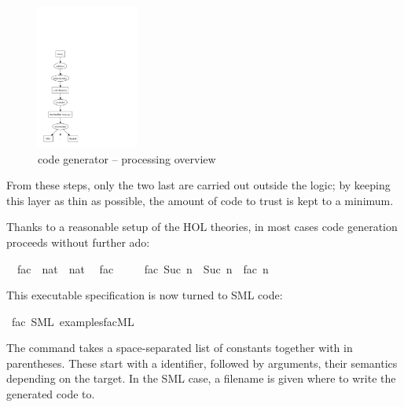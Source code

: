 \begin{isabellebody}
\begin{isamarkuptext}
\begin{itemize}
  \end{itemize}

  \begin{figure}[h]
  \centering
  \includegraphics[width=0.3\textwidth]{codegen_process}
  \caption{code generator -- processing overview}
  \label{fig:process}
  \end{figure}

  From these steps, only the two last are carried out
  outside the logic; by keeping this layer as
  thin as possible, the amount of code to trust is
  kept to a minimum.%
\end{isamarkuptext}%
\isamarkuptrue%
%
\isamarkuptrue%
%
\isamarkuptrue%
%
\begin{isamarkuptext}%
Thanks to a reasonable setup of the HOL theories, in
  most cases code generation proceeds without further ado:%
\end{isamarkuptext}%
\isamarkuptrue%
\isamarkupfalse%
\isanewline
\ \ fac\ {\isacharcolon}{\isacharcolon}\ {\isachardoublequoteopen}nat\ {\isasymRightarrow}\ nat{\isachardoublequoteclose}\isanewline
\isanewline
{}\isamarkupfalse%
\isanewline
\ \ {\isachardoublequoteopen}fac\ {}\ {\isacharequal}\ {}{\isachardoublequoteclose}\isanewline
\ \ {\isachardoublequoteopen}fac\ {\isacharparenleft}Suc\ n{\isacharparenright}\ {\isacharequal}\ Suc\ n\ {\isacharasterisk}\ fac\ n{\isachardoublequoteclose}%
\begin{isamarkuptext}%
This executable specification is now turned to SML code:%
\end{isamarkuptext}%
\isamarkuptrue%
\isamarkupfalse%
\ fac\ {\isacharparenleft}SML\ {\isachardoublequoteopen}examples{\isacharslash}fac{\isachardot}ML{\isachardoublequoteclose}{\isacharparenright}%
\begin{isamarkuptext}%
The \isasymCODEGEN command takes a space-separated list of
  constants together with 
  in parentheses. These start with a 
  identifier, followed by arguments, their semantics
  depending on the target. In the SML case, a filename
  is given where to write the generated code to.


\end{isamarkuptext}
\end{isabellebody}
